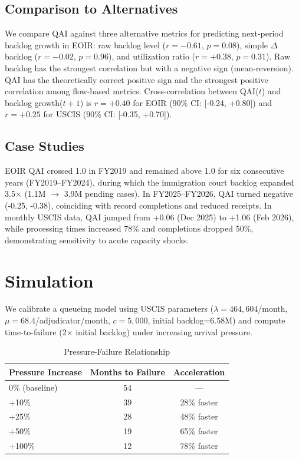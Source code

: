 \documentclass{article}
\begin{document}
\subsection{Comparison to Alternatives}

We compare QAI against three alternative metrics for predicting next-period backlog growth in EOIR: raw backlog level ($r=-0.61$, $p=0.08$), simple $\Delta$backlog ($r=-0.02$, $p=0.96$), and utilization ratio ($r=+0.38$, $p=0.31$). Raw backlog has the strongest correlation but with a negative sign (mean-reversion). QAI has the theoretically correct positive sign and the strongest positive correlation among flow-based metrics. Cross-correlation between QAI($t$) and backlog growth($t+1$) is $r=+0.40$ for EOIR (90\% CI: [-0.24, +0.80]) and $r=+0.25$ for USCIS (90\% CI: [-0.35, +0.70]).

\subsection{Case Studies}

EOIR QAI crossed 1.0 in FY2019 and remained above 1.0 for six consecutive years (FY2019--FY2024), during which the immigration court backlog expanded 3.5$\times$ (1.1M $\to$ 3.9M pending cases). In FY2025--FY2026, QAI turned negative (-0.25, -0.38), coinciding with record completions and reduced receipts. In monthly USCIS data, QAI jumped from +0.06 (Dec 2025) to +1.06 (Feb 2026), while processing times increased 78\% and completions dropped 50\%, demonstrating sensitivity to acute capacity shocks.

\section{Simulation}

We calibrate a queueing model using USCIS parameters ($\lambda=464,604$/month, $\mu=68.4$/adjudicator/month, $c=5,000$, initial backlog=6.58M) and compute time-to-failure (2$\times$ initial backlog) under increasing arrival pressure.

\begin{table}[h]
\centering
\small
\begin{tabular}{lcc}
\toprule
Pressure Increase & Months to Failure & Acceleration \\
\midrule
0\% (baseline) & 54 & — \\
+10\% & 39 & 28\% faster \\
+25\% & 28 & 48\% faster \\
+50\% & 19 & 65\% faster \\
+100\% & 12 & 78\% faster \\
\bottomrule
\end{tabular}
\caption{Pressure-Failure Relationship}
\end{table}
\end{document}
